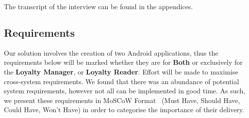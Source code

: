 The transcript of the interview can be found in the appendices. 

\clearpage{}

\subsection{Requirements}
Our solution involves the creation of two Android applications, thus the requirements below will be marked whether they are for \textbf{Both} or exclusively for the \textbf{Loyalty Manager}, or \textbf{Loyalty Reader}. Effort will be made to maximise cross-system requirements. We found that there was an abundance of potential system requirements, however not all can be implemented in good time. As such, we present these requirements in MoSCoW Format~\cite{brennan2009guide} (Must Have, Should Have, Could Have, Won't Have) in order to categorise the importance of their delivery.

